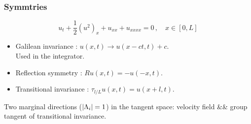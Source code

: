 \documentclass[mathserif, handout]{beamer}
\begin{document}
\begin{frame}
  \frametitle{Symmtries}  
     \[                         
     u_t+\frac{1}{2}(u^2)_x+u_{xx}+u_{xxxx}=0\,,\quad x\in [0,L]
  \]                                                                        

  \begin{itemize}
    \setlength\itemsep{1em}
  \item {\color{cyan} Galilean invariance} :
    $u(x,t) \to u(x-ct,t)+c$.
    \\
    {\color{red} Used} in the integrator.

  \item {\color{cyan} Reflection symmetry} :
    $Ru(x,t)=-u(-x,t)$. 

  \item {\color{cyan} Transitional invariance} :
    $\tau_{l/L}u(x,t)=u(x+l,t)$.
  \end{itemize}

  \pause

  \begin{exampleblock}{Two marginal directions ($|\Lambda_{i}|=1$) in the
      tangent space:}
  velocity field \quad \&\& \quad group tangent of transitional invariance.
  \end{exampleblock}

\end{frame}
\end{document}
